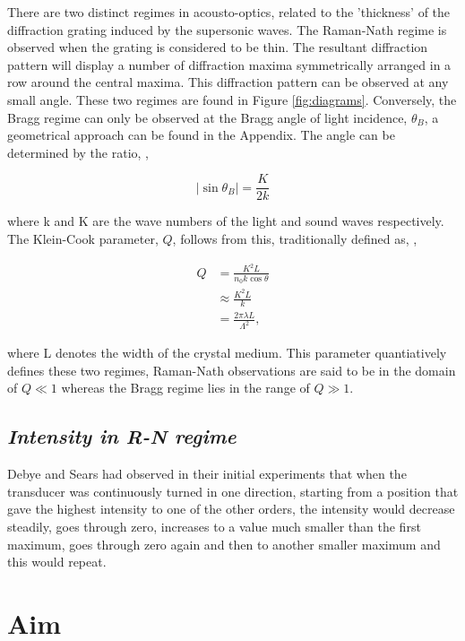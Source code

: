 \documentclass[aps,prl,reprint,10pt,amsmath,amssymb,superscriptaddress,a4paper]{revtex4-2}
\begin{document}
There are two distinct regimes in acousto-optics, related to the 'thickness' of the diffraction grating induced by the supersonic 
waves. The Raman-Nath regime is observed when the grating is considered to be thin. The resultant diffraction pattern will display 
a number of diffraction maxima symmetrically arranged in a row around the central maxima. This diffraction pattern can be observed 
at any small angle. These two regimes are found in Figure \ref{fig:diagrams}. Conversely, the Bragg regime can only be observed at 
the Bragg angle of light incidence, $\theta_B$, a geometrical approach can be found in the Appendix. The angle can 
be determined by the ratio, \citep{Zakharov},

\begin{equation}
    |\sin{\theta_B}| = \frac{K}{2k} 
\end{equation}

where k and K are the wave numbers of the light and sound waves respectively. The Klein-Cook parameter, $Q$, follows from this, 
traditionally defined as, \citep{Gao},

\begin{align} \label{eqn:kleincook}
    Q &= \frac{K^2 L}{n_0 k \cos\theta} \\
    &\approx \frac{K^2 L}{k} \\
    &= \frac{2\pi \lambda L}{\Lambda^2},
\end{align}

where L denotes the width of the crystal medium. This parameter quantiatively defines these two regimes, Raman-Nath observations 
are said to be in the domain of $Q \ll 1$ whereas the Bragg regime lies in the range of $Q \gg 1$. 

\subsection{\normalfont\textit{Intensity in R-N regime}}
Debye and Sears \citep{DebyeSears} had observed in their initial experiments that when the transducer 
was continuously turned in one direction, starting from a position that gave the highest intensity to 
one of the other orders, the intensity would decrease steadily, goes through zero, increases 
to a value much smaller than the first maximum, goes through zero again and then to another smaller maximum 
and this would repeat.

\section{Aim}
\end{document}
